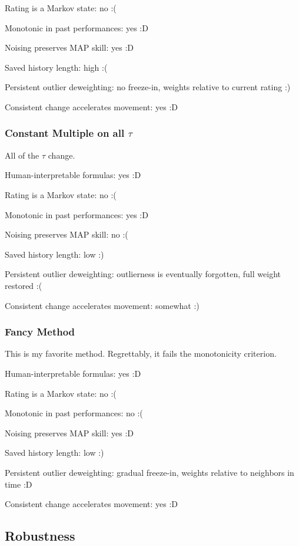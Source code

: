 \documentclass{article}
\begin{document}
Rating is a Markov state: no :(

Monotonic in past performances: yes :D

Noising preserves MAP skill: yes :D

Saved history length: high :(

Persistent outlier deweighting: no freeze-in, weights relative to current rating :)

Consistent change accelerates movement: yes :D

\subsubsection{Constant Multiple on all $\tau$}

All of the $\tau$ change.

Human-interpretable formulas: yes :D

Rating is a Markov state: no :(

Monotonic in past performances: yes :D

Noising preserves MAP skill: no :(

Saved history length: low :)

Persistent outlier deweighting: outlierness is eventually forgotten, full weight restored :(

Consistent change accelerates movement: somewhat :)

\subsubsection{Fancy Method}

This is my favorite method. Regrettably, it fails the monotonicity criterion.

Human-interpretable formulas: yes :D

Rating is a Markov state: no :(

Monotonic in past performances: no :(

Noising preserves MAP skill: yes :D

Saved history length: low :)

Persistent outlier deweighting: gradual freeze-in, weights relative to neighbors in time :D

Consistent change accelerates movement: yes :D

\subsection{Robustness}
\end{document}
